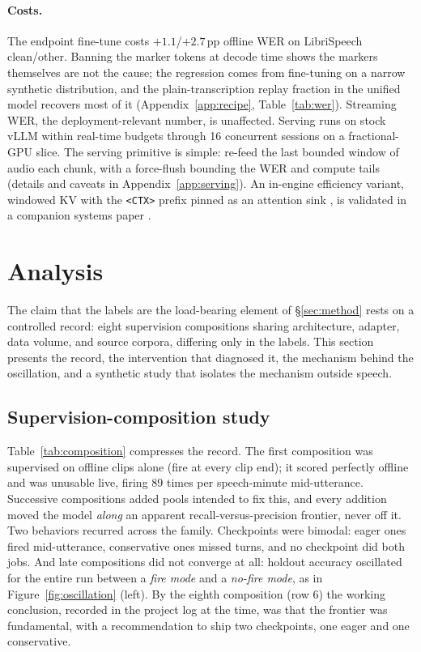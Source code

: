 \documentclass[11pt]{article}
\newcommand{\ctx}{\texttt{<CTX>}}
\begin{document}
\paragraph{Costs.} The endpoint fine-tune costs $+1.1$/$+2.7$\,pp offline WER on LibriSpeech clean/other. Banning the marker tokens at decode time shows the markers themselves are not the cause; the regression comes from fine-tuning on a narrow synthetic distribution, and the plain-transcription replay fraction in the unified model recovers most of it (Appendix~\ref{app:recipe}, Table~\ref{tab:wer}). Streaming WER, the deployment-relevant number, is unaffected. Serving runs on stock vLLM \citep{kwon2023vllm} within real-time budgets through 16 concurrent sessions on a fractional-GPU slice. The serving primitive is simple: re-feed the last bounded window of audio each chunk, with a force-flush bounding the WER and compute tails (details and caveats in Appendix~\ref{app:serving}). An in-engine efficiency variant, windowed KV with the \ctx{} prefix pinned as an attention sink \citep{xiao2024streamingllm}, is validated in a companion systems paper \citep{li2026metronome}.

\section{Analysis}
\label{sec:analysis}

The claim that the labels are the load-bearing element of \S\ref{sec:method} rests on a controlled record: eight supervision compositions sharing architecture, adapter, data volume, and source corpora, differing only in the labels. This section presents the record, the intervention that diagnosed it, the mechanism behind the oscillation, and a synthetic study that isolates the mechanism outside speech.

\subsection{Supervision-composition study}
\label{sec:record}

Table~\ref{tab:composition} compresses the record. The first composition was supervised on offline clips alone (fire at every clip end); it scored perfectly offline and was unusable live, firing 89 times per speech-minute mid-utterance. Successive compositions added pools intended to fix this, and every addition moved the model \emph{along} an apparent recall-versus-precision frontier, never off it. Two behaviors recurred across the family. Checkpoints were bimodal: eager ones fired mid-utterance, conservative ones missed turns, and no checkpoint did both jobs. And late compositions did not converge at all: holdout accuracy oscillated for the entire run between a \emph{fire mode} and a \emph{no-fire mode}, as in Figure~\ref{fig:oscillation} (left). By the eighth composition (row 6) the working conclusion, recorded in the project log at the time, was that the frontier was fundamental, with a recommendation to ship two checkpoints, one eager and one conservative.
\end{document}
